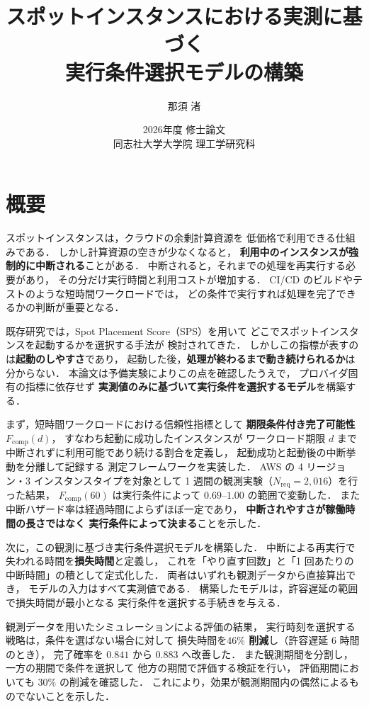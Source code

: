 \documentclass[11pt,a4paper]{ltjsreport}
\title{\vspace{-10mm}
スポットインスタンスにおける実測に基づく\\
実行条件選択モデルの構築}
\author{那須 渚}
\date{2026年度 修士論文\\[2mm] 同志社大学大学院 理工学研究科}
\newcommand{\Fcomp}{F_{\mathrm{comp}}}
\newcommand{\Nreq}{N_{\mathrm{req}}}
\begin{document}
\maketitle

\chapter*{概要}

スポットインスタンスは，クラウドの余剰計算資源を
低価格で利用できる仕組みである．
しかし計算資源の空きが少なくなると，
\textbf{利用中のインスタンスが強制的に中断される}ことがある．
中断されると，それまでの処理を再実行する必要があり，
その分だけ実行時間と利用コストが増加する．
CI/CD のビルドやテストのような短時間ワークロードでは，
どの条件で実行すれば処理を完了できるかの判断が重要となる．

既存研究では，Spot Placement Score（SPS）を用いて
どこでスポットインスタンスを起動するかを選択する手法が
検討されてきた．
しかしこの指標が表すのは\textbf{起動のしやすさ}であり，
起動した後，\textbf{処理が終わるまで動き続けられるか}は
分からない．
本論文は予備実験によりこの点を確認したうえで，
プロバイダ固有の指標に依存せず
\textbf{実測値のみに基づいて実行条件を選択するモデル}を構築する．

まず，短時間ワークロードにおける信頼性指標として
\textbf{期限条件付き完了可能性} $\Fcomp(d)$，
すなわち起動に成功したインスタンスが
ワークロード期限 $d$ まで中断されずに利用可能であり続ける割合を定義し，
起動成功と起動後の中断挙動を分離して記録する
測定フレームワークを実装した．
AWS の 4 リージョン・3 インスタンスタイプを対象として
1 週間の観測実験（$\Nreq = 2{,}016$）を行った結果，
$\Fcomp(60)$ は実行条件によって $0.69$--$1.00$ の範囲で変動した．
また中断ハザード率は経過時間によらずほぼ一定であり，
\textbf{中断されやすさが稼働時間の長さではなく
実行条件によって決まる}ことを示した．

次に，この観測に基づき実行条件選択モデルを構築した．
中断による再実行で失われる時間を\textbf{損失時間}と定義し，
これを「やり直す回数」と「1 回あたりの中断時間」の積として定式化した．
両者はいずれも観測データから直接算出でき，
モデルの入力はすべて実測値である．
構築したモデルは，許容遅延の範囲で損失時間が最小となる
実行条件を選択する手続きを与える．

観測データを用いたシミュレーションによる評価の結果，
実行時刻を選択する戦略は，条件を選ばない場合に対して
損失時間を\textbf{$46\%$ 削減}し（許容遅延 6 時間のとき），
完了確率を $0.841$ から $0.883$ へ改善した．
また観測期間を分割し，一方の期間で条件を選択して
他方の期間で評価する検証を行い，
評価期間においても $30\%$ の削減を確認した．
これにより，効果が観測期間内の偶然によるものでないことを示した．
\end{document}
